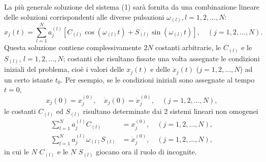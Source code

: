 \documentclass[11pt, a4paper]{book}
\numberwithin{equation}{section}
\begin{document}
La più generale soluzione del sistema (1) sarà fornita da una combinazione lineare delle soluzioni corrispondenti alle diverse pulsazioni $\omega_{(l)}, l = 1, 2, \dots, N$:
\begin{equation}
x_j(t) = \sum_{l=1}^{N} a_j^{(l)} [C_{(l)} \cos(\omega_{(l)} t) + S_{(l)} \sin(\omega_{(l)} t)], \quad (j = 1, 2, \dots, N).
\end{equation}
Questa soluzione contiene complessivamente $2N$ costanti arbitrarie, le $C_{(l)}$ e le $S_{(l)}$, $l = 1, 2, \dots, N$; costanti che risultano fissate una volta assegnate le condizioni iniziali del problema, cioè i valori delle $x_j(t)$ e delle $\dot{x}_j(t)$ ($j = 1, 2, \dots, N$) ad un certo istante $t_0$. Per esempio, se le condizioni iniziali sono assegnate al tempo $t = 0$,
\begin{equation}
x_j(0) = x_j^{(0)}, \quad \dot{x}_j(0) = \dot{x}_j^{(0)}, \quad (j = 1, 2, \dots, N),
\end{equation}
le costanti $C_{(l)}$ ed $S_{(l)}$ risultano determinate dai 2 sistemi lineari non omogenei
\begin{subequations}
\begin{align}
\sum_{l=1}^{N} a_j^{(l)} C_{(l)} &= x_j^{(0)}, \quad (j = 1, 2, \dots, N), \\
\sum_{l=1}^{N} a_j^{(l)} \omega_{(l)} S_{(l)} &= \dot{x}_j^{(0)}, \quad (j = 1, 2, \dots, N),
\end{align}
\end{subequations}
in cui le $N$ $C_{(l)}$ e le $N$ $S_{(l)}$ giocano ora il ruolo di incognite.
\end{document}
